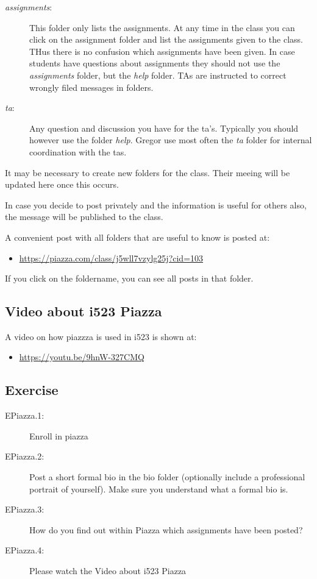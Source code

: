 \begin{description}
\item[\emph{assignments}:]
This folder only lists the assignments. At any time in the class you can
click on the assignment folder and list the assignments given to the
class. THus there is no confusion which assignments have been given. In
case students have questions about assignments they should not use the
\emph{assignments} folder, but the \emph{help} folder. TAs are
instructed to correct wrongly filed messages in folders.
\item[\emph{ta}:]
Any question and discussion you have for the ta's. Typically you should
however use the folder \emph{help}. Gregor use most often the \emph{ta}
folder for internal coordination with the tas.
\end{description}

It may be necessary to create new folders for the class. Their meeing
will be updated here once this occurs.

In case you decide to post privately and the information is useful for
others also, the message will be published to the class.

A convenient post with all folders that are useful to know is posted at:

\begin{itemize}
\tightlist
\item
  \url{https://piazza.com/class/j5wll7vzylg25j?cid=103}
\end{itemize}

If you click on the foldername, you can see all posts in that folder.

\subsection{Video about i523 Piazza}\label{video-about-i523-piazza}

A video on how piazzza is used in i523 is shown at:

\begin{itemize}
\tightlist
\item
  \url{https://youtu.be/9hnW-327CMQ}
\end{itemize}

\subsection{Exercise}\label{exercise}

\begin{description}
\item[EPiazza.1:]
Enroll in piazza
\item[EPiazza.2:]
Post a short formal bio in the bio folder (optionally include a
professional portrait of yourself). Make sure you understand what a
formal bio is.
\item[EPiazza.3:]
How do you find out within Piazza which assignments have been posted?
\item[EPiazza.4:]
Please watch the Video about i523 Piazza
\end{description}
